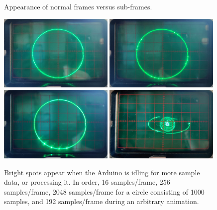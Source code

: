 \documentclass[12pt]{article}
\begin{document}
\begin{figure}[h]
\centering {} 
\caption{Appearance of normal frames versus sub-frames.}
\label{fig:interrupt-hack}
\end{figure}

\begin{figure}[p]
\centering
\includegraphics[width=0.49\textwidth]{images/recv-alias-16.png}\hspace{0.01\textwidth}
\includegraphics[width=0.49\textwidth]{images/recv-alias-256.png}\vspace{0.01\textwidth}
\includegraphics[width=0.49\textwidth]{images/recv-alias-2048.png}\hspace{0.01\textwidth}
\includegraphics[width=0.49\textwidth]{images/recv-alias-anim.png}
\caption{Bright spots appear when the Arduino is idling for more sample data, or processing it. In order, 16 samples/frame, 256 samples/frame, 2048 samples/frame for a circle consisting of 1000 samples, and 192 samples/frame during an arbitrary animation.}
\label{fig:recv-alias}
\end{figure}
\end{document}
